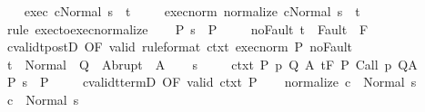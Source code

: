 \begin{isabellebody}
\ \ \isamarkupfalse%
\ exec{\isacharcolon}\ {\isachardoublequoteopen}{\isasymGamma}{\isasymturnstile}{\isasymlangle}c{\isacharcomma}Normal\ s{\isasymrangle}\ {\isasymRightarrow}\ t{\isachardoublequoteclose}\ \isanewline
\ \ \isamarkupfalse%
\ exec{\isacharunderscore}norm{\isacharcolon}\ {\isachardoublequoteopen}{\isasymGamma}{\isasymturnstile}{\isasymlangle}normalize\ c{\isacharcomma}Normal\ s{\isasymrangle}\ {\isasymRightarrow}\ t{\isachardoublequoteclose}\ \isanewline
\ \ \ \ \isamarkupfalse%
\ {\isacharparenleft}rule\ exec{\isacharunderscore}to{\isacharunderscore}exec{\isacharunderscore}normalize{\isacharparenright}\isanewline
\ \ \isamarkupfalse%
\ P{\isacharcolon}\ {\isachardoublequoteopen}s\ {\isasymin}\ P{\isachardoublequoteclose}\ \isanewline
\ \ \isamarkupfalse%
\ noFault{\isacharcolon}\ {\isachardoublequoteopen}t\ {\isasymnotin}\ Fault\ {\isacharbackquote}\ F{\isachardoublequoteclose}\isanewline
\ \ \isamarkupfalse%
\ cvalidt{\isacharunderscore}postD\ {\isacharbrackleft}OF\ valid\ {\isacharbrackleft}rule{\isacharunderscore}format{\isacharbrackright}\ ctxt\ exec{\isacharunderscore}norm\ P\ noFault{\isacharbrackright}\isanewline
\ \ \isamarkupfalse%
\ {\isachardoublequoteopen}t\ {\isasymin}\ Normal\ {\isacharbackquote}\ Q\ {\isasymunion}\ Abrupt\ {\isacharbackquote}\ A{\isachardoublequoteclose}\isacommand{{\isachardot}}\isamarkupfalse%
\isanewline
{}\isamarkupfalse%
\isanewline
\ \ \isamarkupfalse%
\ s\ \isanewline
\ \ \isamarkupfalse%
\ ctxt{\isacharcolon}\ {\isachardoublequoteopen}{\isasymforall}{\isacharparenleft}P{\isacharcomma}\ p{\isacharcomma}\ Q{\isacharcomma}\ A{\isacharparenright}{\isasymin}{\isasymTheta}{\isachardot}\ {\isasymGamma}{\isasymTurnstile}\isactrlsub t\isactrlbsub {\isacharslash}F\isactrlesub \ P\ {\isacharparenleft}Call\ p{\isacharparenright}\ Q{\isacharcomma}A{\isachardoublequoteclose}\ \isanewline
\ \ \isamarkupfalse%
\ P{\isacharcolon}\ {\isachardoublequoteopen}s\ {\isasymin}\ P{\isachardoublequoteclose}\ \isanewline
\ \ \isamarkupfalse%
\ cvalidt{\isacharunderscore}termD\ {\isacharbrackleft}OF\ valid\ ctxt\ P{\isacharbrackright}\isanewline
\ \ \isamarkupfalse%
\ {\isachardoublequoteopen}{\isasymGamma}{\isasymturnstile}normalize\ c\ {\isasymdown}\ Normal\ s{\isachardoublequoteclose}\isacommand{{\isachardot}}\isamarkupfalse%
\isanewline
\ \ \isamarkupfalse%
\ {\isachardoublequoteopen}{\isasymGamma}{\isasymturnstile}c\ {\isasymdown}\ Normal\ s{\isachardoublequoteclose}\isanewline

\end{isabellebody}
